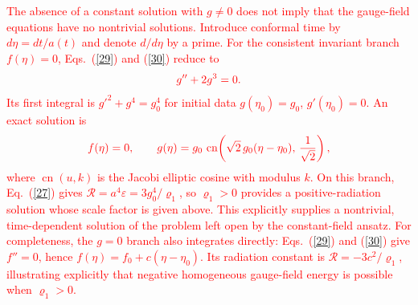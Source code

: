 \documentclass [prd,reprint,eqsecnum,nofootinbib]  {revtex4-1}
\newcommand{\science}[1]{\textcolor{red}{#1}}
\begin{document}
\science{The absence of a constant solution with $g\ne0$ does not
imply that the gauge-field equations have no nontrivial solutions. Introduce
conformal time by $d\eta=dt/a(t)$ and denote $d/d\eta$ by a prime.
For the consistent invariant branch $f(\eta)=0$, Eqs.~(\ref{29}) and
(\ref{30}) reduce to}
\begin{equation}
\science{g''+2g^3=0.}
\end{equation}
\science{Its first integral is $g'^2+g^4=g_0^4$ for initial data
$g(\eta_0)=g_0$, $g'(\eta_0)=0$. An exact solution is}
\begin{equation}
\science{f(\eta)=0,\qquad
g(\eta)=g_0\,\operatorname{cn}\!\left(
\sqrt{2}\,g_0(\eta-\eta_0),\,\frac{1}{\sqrt{2}}\right),}
\end{equation}
\science{where $\operatorname{cn}(u,k)$ is the Jacobi elliptic cosine
with modulus $k$. On this branch, Eq.~(\ref{27}) gives
$\mathcal R=a^4\varepsilon=3g_0^4/\varrho_1$, so $\varrho_1>0$
provides a positive-radiation solution whose scale factor is given
above. This explicitly supplies a nontrivial, time-dependent
solution of the problem left open by the constant-field ansatz.}
\science{For completeness, the $g=0$ branch also integrates directly:
Eqs.~(\ref{29}) and (\ref{30}) give $f''=0$, hence
$f(\eta)=f_0+c(\eta-\eta_0)$. Its radiation constant is
$\mathcal R=-3c^2/\varrho_1$, illustrating explicitly that negative
homogeneous gauge-field energy is possible when $\varrho_1>0$.}
\end{document}
